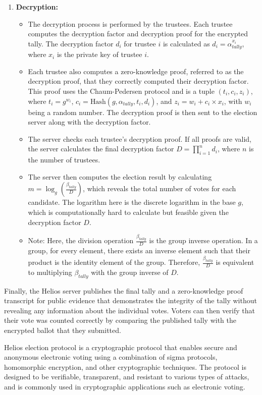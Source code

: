 \begin{enumerate}
\item \textbf{Decryption:}
    \begin{itemize}
    \item The decryption process is performed by the trustees. Each trustee computes the decryption factor and decryption proof for the encrypted tally. The decryption factor \(d_i\) for trustee \(i\) is calculated as \(d_i = \alpha_{tally}^{x_i}\), where \(x_i\) is the private key of trustee \(i\). 
    \item Each trustee also computes a zero-knowledge proof, referred to as the decryption proof, that they correctly computed their decryption factor. This proof uses the Chaum-Pedersen protocol and is a tuple \((t_i, c_i, z_i)\), where \(t_i = g^{w_i}\), \(c_i = \text{Hash}(g, \alpha_{tally}, t_i, d_i)\), and \(z_i = w_i + c_i \times x_i\), with \(w_i\) being a random number. The decryption proof is then sent to the election server along with the decryption factor.
    \item The server checks each trustee's decryption proof. If all proofs are valid, the server calculates the final decryption factor \(D = \prod_{i=1}^{n} d_i\), where \(n\) is the number of trustees. 
    \item The server then computes the election result by calculating \(m = \log_g \left(\frac{\beta_{tally}}{D}\right)\), which reveals the total number of votes for each candidate. The logarithm here is the discrete logarithm in the base \(g\), which is computationally hard to calculate but feasible given the decryption factor \(D\).
    \item Note: Here, the division operation \(\frac{\beta_{tally}}{D}\) is the group inverse operation. In a group, for every element, there exists an inverse element such that their product is the identity element of the group. Therefore, \(\frac{\beta_{tally}}{D}\) is equivalent to multiplying \(\beta_{tally}\) with the group inverse of \(D\).
    \end{itemize}

\end{enumerate}

Finally, the Helios server publishes the final tally and a zero-knowledge proof transcript for public evidence that demonstrates the integrity of the tally without revealing any information about the individual votes. Voters can then verify that their vote was counted correctly by comparing the published tally with the encrypted ballot that they submitted.

Helios election protocol is a cryptographic protocol that enables secure and anonymous electronic voting using a combination of sigma protocols, homomorphic encryption, and other cryptographic techniques. The protocol is designed to be verifiable, transparent, and resistant to various types of attacks, and is commonly used in cryptographic applications such as electronic voting.


